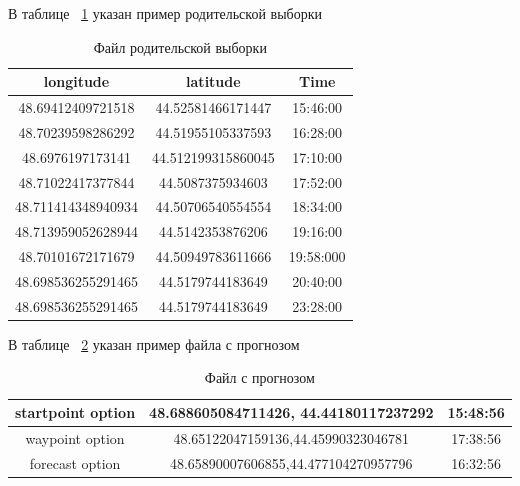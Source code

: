 \documentclass[a4paper,english]{G2-105}
\begin{document}
\newpage
{}
	\par В таблице ~\ref{sample} указан пример родительской выборки
	\begin{longtable}{|c|c|c|}
		\caption {Файл родительской выборки} \label{sample} \\ \hline
		    longitude 				&	 latitude 		         &         Time \\ \hline \endhead
		   48.69412409721518 		&44.52581466171447     	         &      15:46:00 \\ 	\hline
		   48.70239598286292		&44.51955105337593     	         &       16:28:00\\	\hline
		   48.6976197173141 		&44.512199315860045    	         &      17:10:00 \\ 	\hline
		   48.71022417377844		&44.5087375934603    	         &       17:52:00\\	\hline
		   48.711414348940934 		&44.50706540554554    	         &      18:34:00 \\ 	\hline
		   48.713959052628944		&44.5142353876206    	         &       19:16:00\\	\hline
		   48.70101672171679 		&44.50949783611666     	         &      19:58:000 \\ 	\hline
		   48.698536255291465		&44.5179744183649     	         &       20:40:00\\	\hline
		   48.698536255291465 		&44.5179744183649     	         &      23:28:00 \\ 	\hline
	\end{longtable}
	\newpage
{}
	\par В таблице ~\ref{forecast} указан пример файла с прогнозом
	\begin{longtable}{|c|c|c|}
		\caption{Файл с прогнозом} \label{forecast} \\ \hline \endhead
		startpoint option		&48.688605084711426, 44.44180117237292		&15:48:56\\	\hline
		waypoint option		&48.65122047159136,44.45990323046781		&17:38:56\\  \hline
		forecast option		&48.65890007606855,44.477104270957796		&16:32:56\\	 \hline
	\end{longtable}
\end{document}
